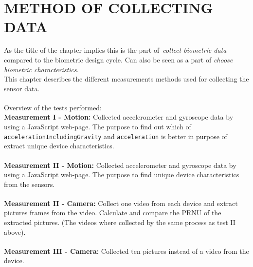 \chapter{METHOD OF COLLECTING DATA}\label{cha:measurements}
As the title of the chapter implies this is the part of~\textit{collect biometric data} compared to the biometric design cycle. Can also be seen as a part of \textit{choose biometric characteristics}.\\
This chapter describes the different measurements methods used for collecting the sensor data.\\
\\
Overview of the tests performed:\\
\textbf{Measurement I - Motion:} Collected accelerometer and gyroscope data by using a JavaScript web-page. The purpose to find out which of\\ \texttt{accelerationIncludingGravity} and \texttt{acceleration} is better in purpose of extract unique device characteristics.\\
\\
\textbf{Measurement II - Motion:} Collected accelerometer and gyroscope data by using a JavaScript web-page. The purpose to find unique device characteristics from the sensors. \\
\\
\textbf{Measurement II - Camera:} Collect one video from each device and extract pictures frames from the video. Calculate and compare the PRNU of the extracted pictures. (The videos where collected by the same process as test II above).\\
\\
\textbf{Measurement III - Camera:} Collected ten pictures instead of a video from the device. 

